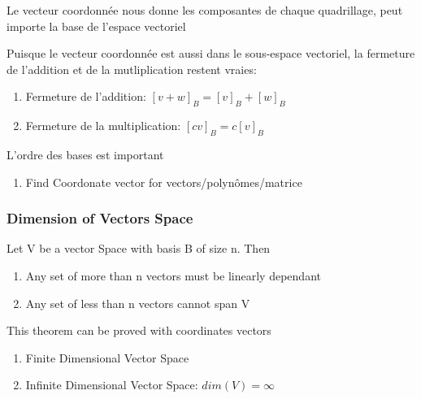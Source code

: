 \documentclass{article}
\begin{document}
\begin{intuition}
    Le vecteur coordonnée nous donne les composantes de chaque
    quadrillage, peut importe la base de l'espace vectoriel
\end{intuition}

\begin{remark}
    Puisque le vecteur coordonnée est aussi dans le sous-espace
    vectoriel, la fermeture de l'addition et de la mutliplication
    restent vraies:
    \begin{enumerate}
	\item Fermeture de l'addition: $ [v + w]_B = [v]_B + [w]_B $
	\item Fermeture de la multiplication: $ [cv]_B = c [v]_B $
    \end{enumerate}
    L'ordre des bases est important
\end{remark}

\begin{problem}
    \begin{enumerate}
        \item Find Coordonate vector for vectors/polynômes/matrice
    \end{enumerate}
\end{problem}

\subsubsection{Dimension of Vectors Space}%
\label{ssub:Dimension of Vectors Space}

\begin{theorem}
    Let V be a vector Space with basis B of size n. Then
    \begin{enumerate}
        \item Any set of more than n vectors must be linearly dependant
	\item Any set of less than n vectors cannot span V
    \end{enumerate}
    This theorem can be proved with coordinates vectors
\end{theorem}

\begin{definition}
    \begin{enumerate}
        \item Finite Dimensional Vector Space
	\item Infinite Dimensional Vector Space: $dim(V) = \infty $
    \end{enumerate}
\end{definition}
\end{document}
